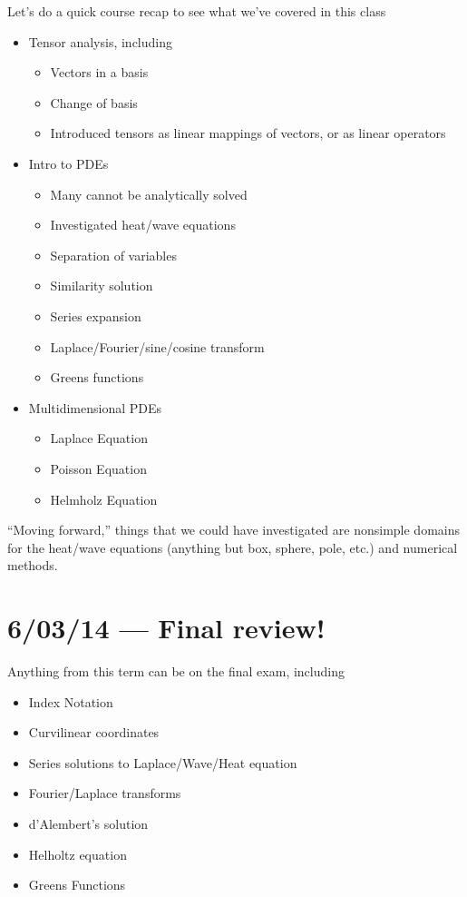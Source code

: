 \documentclass[10pt]{report}
\begin{document}
Let's do a quick course recap to see what we've covered in this class
\begin{itemize}
    \item Tensor analysis, including
        \begin{itemize}
            \item Vectors in a basis
            \item Change of basis
            \item Introduced tensors as linear mappings of vectors, or as linear operators
        \end{itemize}
    \item Intro to PDEs
        \begin{itemize}
            \item Many cannot be analytically solved
            \item Investigated heat/wave equations
            \item Separation of variables
            \item Similarity solution
            \item Series expansion
            \item Laplace/Fourier/sine/cosine transform
            \item Greens functions
        \end{itemize}
    \item Multidimensional PDEs
        \begin{itemize}
            \item Laplace Equation
            \item Poisson Equation
            \item Helmholz Equation
        \end{itemize}
\end{itemize}

``Moving forward,'' things that we could have investigated are nonsimple domains for the heat/wave equations (anything but box, sphere, pole, etc.) and numerical methods. 

\chapter{6/03/14 --- Final review!}

Anything from this term can be on the final exam, including
\begin{itemize}
    \item Index Notation
    \item Curvilinear coordinates
    \item Series solutions to Laplace/Wave/Heat equation
    \item Fourier/Laplace transforms
    \item d'Alembert's solution
    \item Helholtz equation
    \item Greens Functions
\end{itemize}
\end{document}
